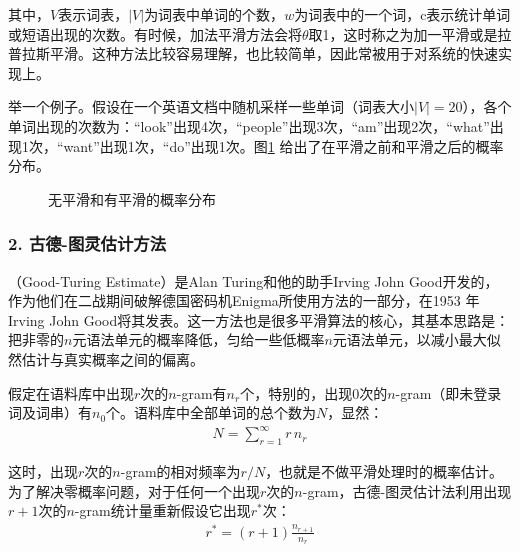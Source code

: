 \noindent 其中，$V$表示词表，$|V|$为词表中单词的个数，$w$为词表中的一个词，c表示统计单词或短语出现的次数。有时候，加法平滑方法会将$\theta$取1，这时称之为加一平滑或是拉普拉斯平滑。这种方法比较容易理解，也比较简单，因此常被用于对系统的快速实现上。

\parinterval 举一个例子。假设在一个英语文档中随机采样一些单词（词表大小$|V|=20$），各个单词出现的次数为：“look”出现4次，“people”出现3次，“am”出现2次，“what”出现1次，“want”出现1次，“do”出现1次。图\ref{fig:2-11} 给出了在平滑之前和平滑之后的概率分布。

\begin{figure}[htp]
    \centering
 	
	\caption{无平滑和有平滑的概率分布}
    \label{fig:2-11}
\end{figure}


\subsubsection{2. 古德-图灵估计方法}

\vspace{-0.5em}
（Good-Turing Estimate）是Alan Turing和他的助手Irving John Good开发的，作为他们在二战期间破解德国密码机Enigma所使用方法的一部分，在1953 年Irving John Good将其发表。这一方法也是很多平滑算法的核心，其基本思路是：把非零的$n$元语法单元的概率降低，匀给一些低概率$n$元语法单元，以减小最大似然估计与真实概率之间的偏离。

\parinterval 假定在语料库中出现$r$次的$n$-gram有$n_r$个，特别的，出现0次的$n$-gram（即未登录词及词串）有$n_0$个。语料库中全部单词的总个数为$N$，显然：
\begin{eqnarray}
N = \sum_{r=1}^{\infty}{r\,n_r}
\label{eq:2-28}
\end{eqnarray}

\parinterval 这时，出现$r$次的$n$-gram的相对频率为$r/N$，也就是不做平滑处理时的概率估计。为了解决零概率问题，对于任何一个出现$r$次的$n$-gram，古德-图灵估计法利用出现$r+1$次的$n$-gram统计量重新假设它出现$r^*$次：
\begin{eqnarray}
r^* = (r + 1)\frac{n_{r + 1}}{n_r}
\label{eq:2-29}
\end{eqnarray}

